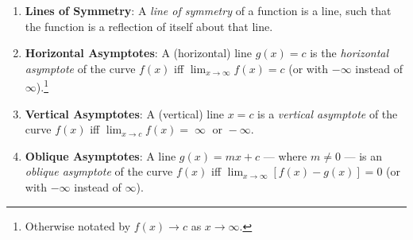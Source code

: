 \documentclass[oneside]{book}
\begin{document}
\begin{definition*}{}{}
  \begin{enumerate}
    \item \textbf{Lines of Symmetry}: A \emph{line of symmetry} of a function is a line, such that the function is a reflection of itself about that line.
    \item \textbf{Horizontal Asymptotes}: A (horizontal) line \(g(x)=c\) is the \emph{horizontal asymptote} of the curve \(f(x)\) iff \(\lim_{x \to \infty}{f(x)}=c\) (or with \(-\infty\) instead of \(\infty\)).\footnote{Otherwise notated by \(f(x) \to c\) as \(x \to \infty\).}
    \item \textbf{Vertical Asymptotes}: A (vertical) line \(x=c\) is a \emph{vertical asymptote} of the curve \(f(x)\) iff \(\lim_{x \to c}{f(x)}=\operatorname{\infty} \text{ or } -\infty\).
    \item \textbf{Oblique Asymptotes}: A line \(g(x)=mx+c\) --- where \(m \neq 0\) --- is an \emph{oblique asymptote} of the curve \(f(x)\) iff \(\lim_{x \to \infty}[f(x)-g(x)]=0\) (or with \(-\infty\) instead of \(\infty\)).
\end{enumerate}
\end{definition*}
\end{document}
